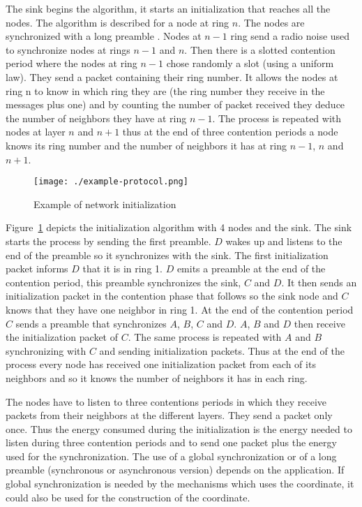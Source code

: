 \documentclass[a4paper]{article}
\begin{document}
The sink begins the algorithm, it starts an initialization that reaches all the nodes. The algorithm is described for a node at ring $n$. The nodes are synchronized with a long preamble \cite{Polastre04}. Nodes at $n-1$ ring send a radio noise used to synchronize nodes at rings $n-1$ and $n$. Then there is a slotted contention period where the nodes at ring $n-1$ chose randomly a slot (using a uniform law). They send a packet containing their ring number. It allows the nodes at ring n to know in which ring they are (the ring number they receive in the messages plus one) and by counting the number of packet received they deduce the number of neighbors they have at ring $n-1$. The process is repeated with nodes at layer $n$ and $n+1$ thus at the end of three contention periods a node knows its ring number and the number of neighbors it has at ring $n-1$, $n$ and $n+1$. 

\begin{figure}[!h]
  \centering
  \texttt{[image: ./example-protocol.png]}
  \caption{Example of network initialization}
  \label{example}
\end{figure}

Figure~\ref{example} depicts the initialization algorithm with 4 nodes and the sink. The sink starts the process by sending the first preamble. $D$ wakes up and listens to the end of the preamble so it synchronizes with the sink. The first initialization packet informs $D$ that it is in ring 1. $D$ emits a preamble at the end of the contention period, this preamble synchronizes the sink, $C$ and $D$. It then sends an initialization packet in the contention phase that follows so the sink node and $C$ knows that they have one neighbor in ring 1. At the end of the contention period $C$ sends a preamble that synchronizes $A$, $B$, $C$ and $D$. $A$, $B$ and $D$ then receive the initialization packet of $C$. The same process is repeated with $A$ and $B$ synchronizing with $C$ and sending initialization packets. Thus at the end of the process every node has received one initialization packet from each of its neighbors and so it knows the number of neighbors it has in each ring.

The nodes have to listen to three contentions periods in which they receive packets from their neighbors at the different layers. They send a packet only once. Thus the energy consumed during the initialization is the energy needed to listen during three contention periods and to send one packet plus the energy used for the synchronization. The use of a global synchronization or of a long preamble (synchronous or asynchronous version) depends on the application. If global synchronization is needed by the mechanisms which uses the coordinate, it could also be used for the construction of the coordinate.
\end{document}
